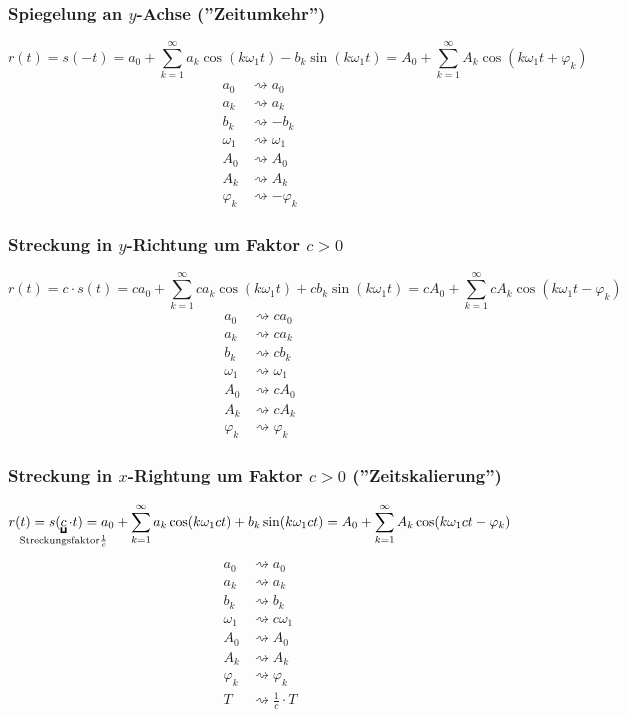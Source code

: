 \subsubsection{Spiegelung an $y$-Achse (''Zeitumkehr'')}
\[
	r(t) = s(-t) = a_0 + \sum^\infty_{k=1} a_k \cos( k \omega_1 t) - b_k \sin(k \omega_1 t)
	     = A_0 + \sum^\infty_{k=1} A_k \cos(k\omega_1 t + \varphi_k)
\] \begin{align*}
a_0 &\rightsquigarrow a_0 \\
a_k &\rightsquigarrow a_k \\
b_k &\rightsquigarrow -b_k \\
\omega_1 &\rightsquigarrow \omega_1 \\
A_0 &\rightsquigarrow A_0 \\
A_k &\rightsquigarrow A_k \\
\varphi_k &\rightsquigarrow -\varphi_k
\end{align*}

\subsubsection{Streckung in $y$-Richtung um Faktor $c > 0$}
\[
	r(t) = c \cdot s(t) = c a_0 + \sum^\infty_{k=1} c a_k \cos(k \omega_1 t) + c b_k \sin(k \omega_1 t) = c A_0 + \sum^\infty_{k=1} c A_k \cos(k \omega_1 t - \varphi_k)
\] \begin{align*}
a_0 &\rightsquigarrow c a_0 \\
a_k &\rightsquigarrow c a_k \\
b_k &\rightsquigarrow c b_k \\
\omega_1 &\rightsquigarrow \omega_1 \\
A_0 &\rightsquigarrow c A_0 \\
A_k &\rightsquigarrow c A_k \\
\varphi_k &\rightsquigarrow \varphi_k
\end{align*}

\subsubsection{Streckung in $x$-Rightung um Faktor $c > 0$ (''Zeitskalierung'')}
\[
	r(t) = s(\underbracket{c}_{\mathclap{\text{Streckungsfaktor} \frac{1}{c}}} \cdot t) = a_0 + \sum^\infty_{k=1} a_k \cos(k \omega_1 c t) + b_k \sin(k \omega_1 c t)
		= A_0 + \sum^\infty_{k=1} A_k \cos(k \omega_1 c t - \varphi_k)
\] \begin{align*}
a_0 &\rightsquigarrow a_0 \\
a_k &\rightsquigarrow a_k \\
b_k &\rightsquigarrow b_k \\
\omega_1 &\rightsquigarrow c \omega_1 \\
A_0 &\rightsquigarrow A_0 \\
A_k &\rightsquigarrow A_k \\
\varphi_k &\rightsquigarrow \varphi_k \\
T &\rightsquigarrow \frac{1}{c} \cdot T
\end{align*}

